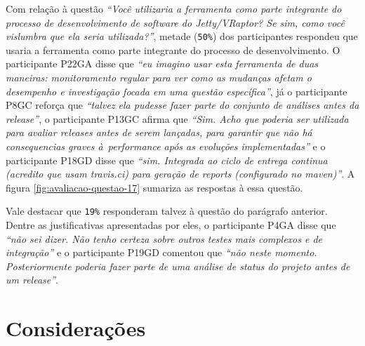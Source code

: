 Com relação à questão \textit{``Você utilizaria a ferramenta como parte integrante do processo de desenvolvimento de software do Jetty/VRaptor? Se sim, como você vislumbra que ela seria utilizada?''}, metade (\texttt{50\%}) dos participantes respondeu que usaria a ferramenta como parte integrante do processo de desenvolvimento. O participante P22GA disse que \textit{``eu imagino usar esta ferramenta de duas maneiras: monitoramento regular para ver como as mudanças afetam o desempenho e investigação focada em uma questão específica''}, já o participante P8GC reforça que \textit{``talvez ela pudesse fazer parte do conjunto de análises antes da release''}, o participante P13GC afirma que \textit{``Sim. Acho que poderia ser utilizada para avaliar releases antes de serem lançadas, para garantir que não há consequencias graves à performance após as evoluções implementadas''} e o participante P18GD disse que \textit{``sim. Integrada ao ciclo de entrega continua (acredito que usam travis.ci) para geração de reports (configurado no maven)''}. A figura \ref{fig:avaliacao-questao-17} sumariza as respostas à essa questão.

Vale destacar que \texttt{19\%} responderam talvez à questão do parágrafo anterior. Dentre as justificativas apresentadas por eles, o participante P4GA disse que \textit{``não sei dizer. Não tenho certeza sobre outros testes mais complexos e de integração''} e o participante P19GD comentou que \textit{``não neste momento. Posteriormente poderia fazer parte de uma análise de status do projeto antes de um release''}.

\section{Considerações} \label{sec:avaliacao-consideracoes}